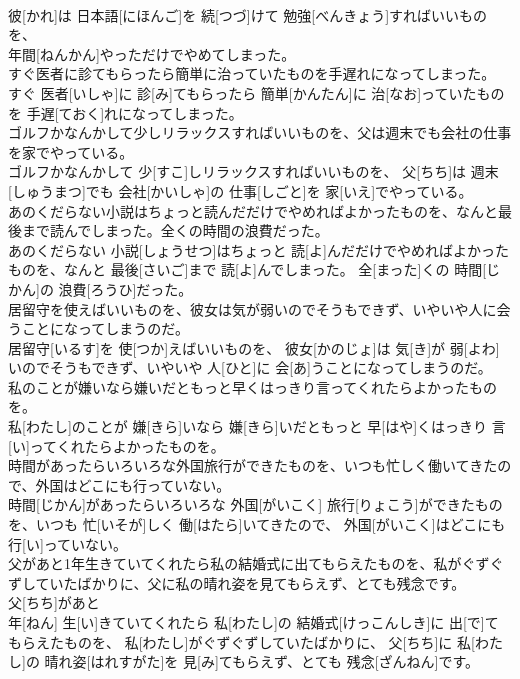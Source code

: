 \documentclass[8pt]{extreport}
\begin{document}
\begin{CJK}{UTF8}{min}
\\	彼[かれ]は 日本語[にほんご]を 続[つづ]けて 勉強[べんきょう]すればいいものを、 
\\	年間[ねんかん]やっただけでやめてしまった。
\\	すぐ医者に診てもらったら簡単に治っていたものを手遅れになってしまった。	
\\	すぐ 医者[いしゃ]に 診[み]てもらったら 簡単[かんたん]に 治[なお]っていたものを 手遅[ておく]れになってしまった。
\\	ゴルフかなんかして少しリラックスすればいいものを、父は週末でも会社の仕事を家でやっている。	
\\	ゴルフかなんかして 少[すこ]しリラックスすればいいものを、 父[ちち]は 週末[しゅうまつ]でも 会社[かいしゃ]の 仕事[しごと]を 家[いえ]でやっている。
\\	あのくだらない小説はちょっと読んだだけでやめればよかったものを、なんと最後まで読んでしまった。全くの時間の浪費だった。	
\\	あのくだらない 小説[しょうせつ]はちょっと 読[よ]んだだけでやめればよかったものを、なんと 最後[さいご]まで 読[よ]んでしまった。 全[まった]くの 時間[じかん]の 浪費[ろうひ]だった。
\\	居留守を使えばいいものを、彼女は気が弱いのでそうもできず、いやいや人に会うことになってしまうのだ。	
\\	居留守[いるす]を 使[つか]えばいいものを、 彼女[かのじょ]は 気[き]が 弱[よわ]いのでそうもできず、いやいや 人[ひと]に 会[あ]うことになってしまうのだ。
\\	私のことが嫌いなら嫌いだともっと早くはっきり言ってくれたらよかったものを。	
\\	私[わたし]のことが 嫌[きら]いなら 嫌[きら]いだともっと 早[はや]くはっきり 言[い]ってくれたらよかったものを。
\\	時間があったらいろいろな外国旅行ができたものを、いつも忙しく働いてきたので、外国はどこにも行っていない。	
\\	時間[じかん]があったらいろいろな 外国[がいこく] 旅行[りょこう]ができたものを、いつも 忙[いそが]しく 働[はたら]いてきたので、 外国[がいこく]はどこにも 行[い]っていない。
\\	父があと1年生きていてくれたら私の結婚式に出てもらえたものを、私がぐずぐずしていたばかりに、父に私の晴れ姿を見てもらえず、とても残念です。	
\\	父[ちち]があと 
\\	年[ねん] 生[い]きていてくれたら 私[わたし]の 結婚式[けっこんしき]に 出[で]てもらえたものを、 私[わたし]がぐずぐずしていたばかりに、 父[ちち]に 私[わたし]の 晴れ姿[はれすがた]を 見[み]てもらえず、とても 残念[ざんねん]です。

\end{CJK}
\end{document}
